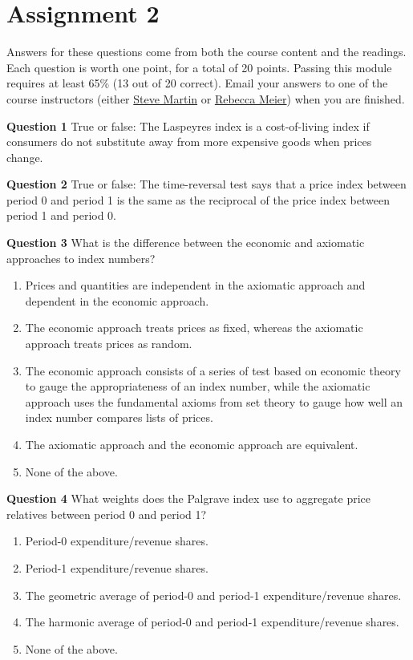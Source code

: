 \documentclass[]{article}
\begin{document}
\hypertarget{assignment-2}{%
\section{Assignment 2}\label{assignment-2}}

Answers for these questions come from both the course content and the readings. Each question is worth one point, for a total of 20 points. Passing this module requires at least 65\% (13 out of 20 correct). Email your answers to one of the course instructors (either \href{mailto:steve.martin5@canada.ca}{Steve Martin} or \href{mailto:rebecca.meier@canada.ca}{Rebecca Meier}) when you are finished.

\textbf{Question 1} True or false: The Laspeyres index is a cost-of-living index if consumers do not substitute away from more expensive goods when prices change.

\textbf{Question 2} True or false: The time-reversal test says that a price index between period 0 and period 1 is the same as the reciprocal of the price index between period 1 and period 0.

\textbf{Question 3} What is the difference between the economic and axiomatic approaches to index numbers?

\begin{enumerate}
\def\labelenumi{\alph{enumi})}
\item
  Prices and quantities are independent in the axiomatic approach and dependent in the economic approach.
\item
  The economic approach treats prices as fixed, whereas the axiomatic approach treats prices as random.
\item
  The economic approach consists of a series of test based on economic theory to gauge the appropriateness of an index number, while the axiomatic approach uses the fundamental axioms from set theory to gauge how well an index number compares lists of prices.
\item
  The axiomatic approach and the economic approach are equivalent.
\item
  None of the above.
\end{enumerate}

\textbf{Question 4} What weights does the Palgrave index use to aggregate price relatives between period 0 and period 1?

\begin{enumerate}
\def\labelenumi{\alph{enumi})}
\item
  Period-0 expenditure/revenue shares.
\item
  Period-1 expenditure/revenue shares.
\item
  The geometric average of period-0 and period-1 expenditure/revenue shares.
\item
  The harmonic average of period-0 and period-1 expenditure/revenue shares.
\item
  None of the above.
\end{enumerate}
\end{document}
